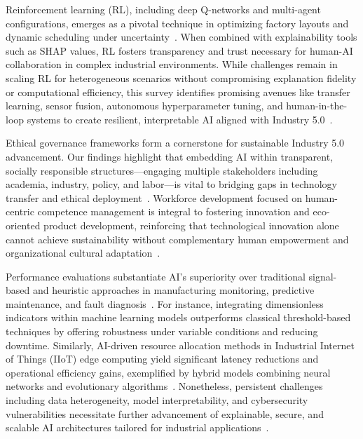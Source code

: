\documentclass[sigconf]{acmart}
\begin{document}
Reinforcement learning (RL), including deep Q-networks and multi-agent configurations, emerges as a pivotal technique in optimizing factory layouts and dynamic scheduling under uncertainty~\cite{ref5,ref30}. When combined with explainability tools such as SHAP values, RL fosters transparency and trust necessary for human-AI collaboration in complex industrial environments. While challenges remain in scaling RL for heterogeneous scenarios without compromising explanation fidelity or computational efficiency, this survey identifies promising avenues like transfer learning, sensor fusion, autonomous hyperparameter tuning, and human-in-the-loop systems to create resilient, interpretable AI aligned with Industry 5.0~\cite{ref5,ref30,ref35,ref36}.

Ethical governance frameworks form a cornerstone for sustainable Industry 5.0 advancement. Our findings highlight that embedding AI within transparent, socially responsible structures—engaging multiple stakeholders including academia, industry, policy, and labor—is vital to bridging gaps in technology transfer and ethical deployment~\cite{ref3,ref25,ref38}. Workforce development focused on human-centric competence management is integral to fostering innovation and eco-oriented product development, reinforcing that technological innovation alone cannot achieve sustainability without complementary human empowerment and organizational cultural adaptation~\cite{ref19,ref21,ref14}.

Performance evaluations substantiate AI's superiority over traditional signal-based and heuristic approaches in manufacturing monitoring, predictive maintenance, and fault diagnosis~\cite{ref4,ref24,ref32}. For instance, integrating dimensionless indicators within machine learning models outperforms classical threshold-based techniques by offering robustness under variable conditions and reducing downtime. Similarly, AI-driven resource allocation methods in Industrial Internet of Things (IIoT) edge computing yield significant latency reductions and operational efficiency gains, exemplified by hybrid models combining neural networks and evolutionary algorithms~\cite{ref31,ref34}. Nonetheless, persistent challenges including data heterogeneity, model interpretability, and cybersecurity vulnerabilities necessitate further advancement of explainable, secure, and scalable AI architectures tailored for industrial applications~\cite{ref29,ref35,ref39}.
\end{document}

